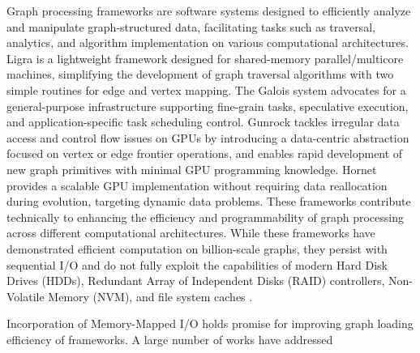 Graph processing frameworks are software systems designed to efficiently analyze and manipulate graph-structured data, facilitating tasks such as traversal, analytics, and algorithm implementation on various computational architectures. Ligra \cite{shun2013ligra} is a lightweight framework designed for shared-memory parallel/multicore machines, simplifying the development of graph traversal algorithms with two simple routines for edge and vertex mapping. The Galois system \cite{nguyen2013lightweight} advocates for a general-purpose infrastructure supporting fine-grain tasks, speculative execution, and application-specific task scheduling control. Gunrock \cite{wang2016gunrock} tackles irregular data access and control flow issues on GPUs by introducing a data-centric abstraction focused on vertex or edge frontier operations, and enables rapid development of new graph primitives with minimal GPU programming knowledge. Hornet \cite{busato2018hornet} provides a scalable GPU implementation without requiring data reallocation during evolution, targeting dynamic data problems. These frameworks contribute technically to enhancing the efficiency and programmability of graph processing across different computational architectures. While these frameworks have demonstrated efficient computation on billion-scale graphs, they persist with sequential I/O and do not fully exploit the capabilities of modern Hard Disk Drives (HDDs), Redundant Array of Independent Disks (RAID) controllers, Non-Volatile Memory (NVM), and file system caches \cite{gabert2021pigo}.

Incorporation of Memory-Mapped I/O holds promise for improving graph loading efficiency of frameworks. A large number of works have addressed 



